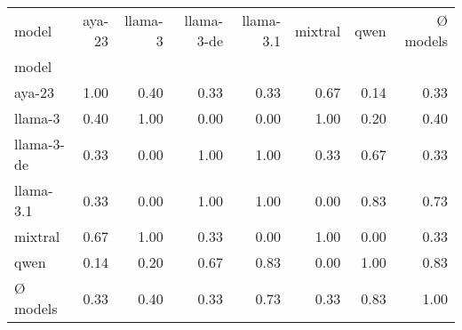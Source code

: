 \begin{tabular}{lrrrrrrr}
\toprule
model & aya-23 & llama-3 & llama-3-de & llama-3.1 & mixtral & qwen & Ø models \\
model &  &  &  &  &  &  &  \\
\midrule
aya-23 & 1.00 & 0.40 & 0.33 & 0.33 & 0.67 & 0.14 & 0.33 \\
llama-3 & 0.40 & 1.00 & 0.00 & 0.00 & 1.00 & 0.20 & 0.40 \\
llama-3-de & 0.33 & 0.00 & 1.00 & 1.00 & 0.33 & 0.67 & 0.33 \\
llama-3.1 & 0.33 & 0.00 & 1.00 & 1.00 & 0.00 & 0.83 & 0.73 \\
mixtral & 0.67 & 1.00 & 0.33 & 0.00 & 1.00 & 0.00 & 0.33 \\
qwen & 0.14 & 0.20 & 0.67 & 0.83 & 0.00 & 1.00 & 0.83 \\
Ø models & 0.33 & 0.40 & 0.33 & 0.73 & 0.33 & 0.83 & 1.00 \\
\bottomrule
\end{tabular}
